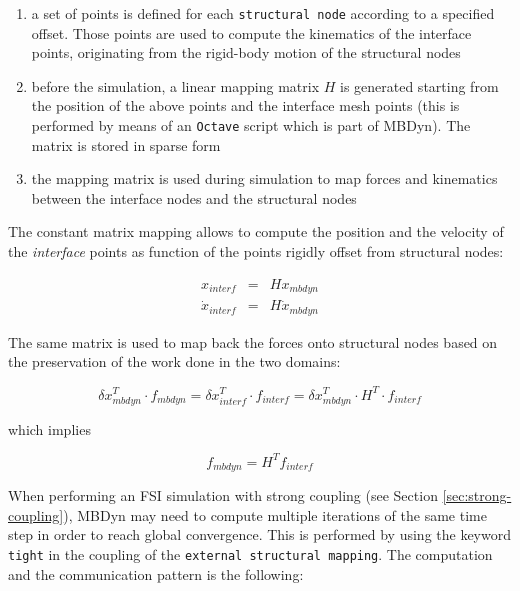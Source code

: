 \begin{enumerate}
	\item a set of points is defined for each \texttt{structural node} according to a specified offset. Those points are used to compute the kinematics of the interface points, originating from the rigid-body motion of the structural nodes
	\item before the simulation, a linear mapping matrix $H$ is generated starting from the position of the above points and the interface mesh points (this is performed by means of an \texttt{Octave} script which is part of MBDyn). The matrix is stored in sparse form
	\item the mapping matrix is used during simulation to map forces and kinematics between the interface nodes and the structural nodes
\end{enumerate}

The constant matrix mapping allows to compute the position and the velocity of the \textit{interface} points as function of the points rigidly offset from structural nodes:

\begin{subequations}
	\begin{eqnarray}
		x_{interf} &=& H x_{mbdyn} \\
		\dot{x}_{interf} &=& H \dot{x}_{mbdyn} 
	\end{eqnarray}
\end{subequations}

The same matrix is used to map back the forces onto structural nodes based on the preservation of the work done in the two domains:

\begin{equation}
	\delta x_{mbdyn}^T \cdot f_{mbdyn} =  \delta x_{interf}^T \cdot f_{interf} = \delta x_{mbdyn}^T \cdot H^T \cdot f_{interf} 
\end{equation}

which implies

\begin{equation}
	f_{mbdyn} = H^T f_{interf}
\end{equation}

When performing an FSI simulation with strong coupling (see Section \ref{sec:strong-coupling}), MBDyn may need to compute multiple iterations of the same time step in order to reach global convergence. This is performed by using the keyword \texttt{tight} in the coupling of the \texttt{external structural mapping}. The computation and the communication pattern is the following:

